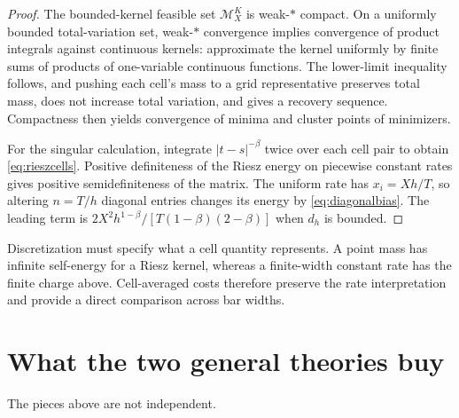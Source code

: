 \documentclass[11pt]{article}
\numberwithin{equation}{section}
\theoremstyle{definition}
\theoremstyle{remark}
\theoremstyle{definition}
\begin{document}
\begin{proof}
The bounded-kernel feasible set $\mathcal M_X^K$ is weak-$*$ compact.
On a uniformly bounded total-variation set, weak-$*$ convergence implies
convergence of product integrals against continuous kernels: approximate
the kernel uniformly by finite sums of products of one-variable continuous
functions. The lower-limit inequality follows, and pushing each cell's mass
to a grid representative preserves total mass, does not increase total
variation, and gives a recovery sequence. Compactness then yields convergence
of minima and cluster points of minimizers.

For the singular calculation, integrate $|t-s|^{-\beta}$ twice over each
cell pair to obtain \eqref{eq:rieszcells}. Positive definiteness of the Riesz
energy on piecewise constant rates gives positive semidefiniteness of the
matrix. The uniform rate has $x_i=Xh/T$, so altering $n=T/h$ diagonal
entries changes its energy by \eqref{eq:diagonalbias}. The leading term is
$2X^2h^{1-\beta}/[T(1-\beta)(2-\beta)]$ when $d_h$ is bounded.
\end{proof}

Discretization must specify what a cell quantity represents. A point mass
has infinite self-energy for a Riesz kernel, whereas a finite-width constant
rate has the finite charge above. Cell-averaged costs therefore preserve the
rate interpretation and provide a direct comparison across bar widths.

\section{What the two general theories buy}\label{sec:synthesis}

The pieces above are not independent.
\end{document}
